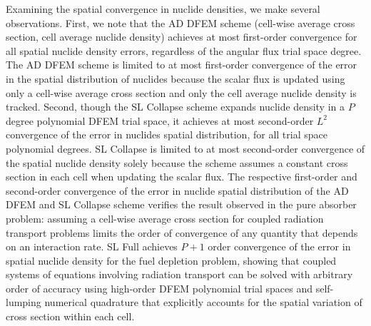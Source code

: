 Examining the spatial convergence in nuclide densities, we make several observations.  
First, we note that the AD DFEM scheme (cell-wise average cross section, cell average nuclide density) achieves at most first-order convergence for all spatial nuclide density errors, regardless of the angular flux trial space degree.  
The AD DFEM scheme is limited to at most first-order convergence of the error in the spatial distribution of nuclides because the scalar flux is updated using only a cell-wise average cross section and only the cell average nuclide density is tracked.
Second, though the SL Collapse scheme expands nuclide density in a $P$ degree polynomial DFEM trial space, it achieves at most second-order $L^2$ convergence of the error in nuclides spatial distribution, for all trial  space polynomial degrees.  
SL Collapse is limited to at most second-order convergence of the spatial nuclide density solely because the scheme assumes a constant cross section in each cell when updating the scalar flux.  
The respective first-order and second-order convergence of the error in nuclide spatial distribution of the AD DFEM and SL Collapse scheme verifies the result observed in the pure absorber problem: assuming a cell-wise average cross section for coupled radiation transport problems limits the order of convergence of any quantity that depends on an interaction rate.
SL Full achieves $P+1$ order convergence of the error in spatial nuclide density for the fuel depletion problem, showing that coupled systems of equations involving radiation transport can be solved with arbitrary order of accuracy using high-order DFEM polynomial trial spaces and self-lumping numerical quadrature that explicitly accounts for the spatial variation of cross section within each cell.

